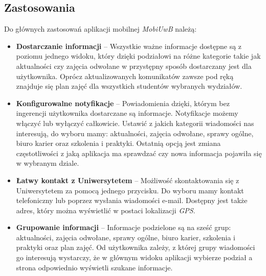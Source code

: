 \documentclass{iiuwb}
\begin{document}
\subsection{Zastosowania}
Do głównych zastosowań aplikacji mobilnej \textit{MobiUwB} należą:
\begin{itemize}
\item \textbf{Dostarczanie informacji} -- Wszystkie ważne informacje dostępne są z poziomu jednego widoku, który dzięki podziałowi na różne kategorie takie jak aktualności czy zajęcia odwołane w przystępny sposób dostarczany jest dla użytkownika. Oprócz aktualizowanych komunikatów zawsze pod ręką znajduje się plan zajęć dla wszystkich studentów wybranych wydziałów.
\item \textbf{Konfigurowalne notyfikacje} -- Powiadomienia dzięki, którym bez ingerencji użytkownika dostarczane są informacje. Notyfikacje możemy włączyć lub wyłączyć całkowicie. Ustawić z jakich kategorii wiadomości nas interesują, do wyboru mamy: aktualności, zajęcia odwołane, sprawy ogólne, biuro karier oraz szkolenia i praktyki. Ostatnią opcją jest zmiana częstotliwości z jaką aplikacja ma sprawdzać czy nowa informacja pojawiła się w wybranym dziale.
\item \textbf{Łatwy kontakt z Uniwersytetem} -- Możliwość skontaktowania się z Uniwersytetem za pomocą jednego przycisku. Do wyboru mamy kontakt telefoniczny lub poprzez wysłania wiadomości e-mail. Dostępny jest także adres, który można wyświetlić w postaci lokalizacji \textit{GPS}.
\item \textbf{Grupowanie informacji} -- Informacje podzielone są na sześć grup: aktualności, zajęcia odwołane, sprawy ogólne, biuro karier, szkolenia i praktyki oraz plan zajęć. Od użytkownika zależy, z której grupy wiadomości go interesują wystarczy, że w głównym widoku aplikacji wybierze podział a strona odpowiednio wyświetli szukane informacje.
\end{itemize}
\end{document}
